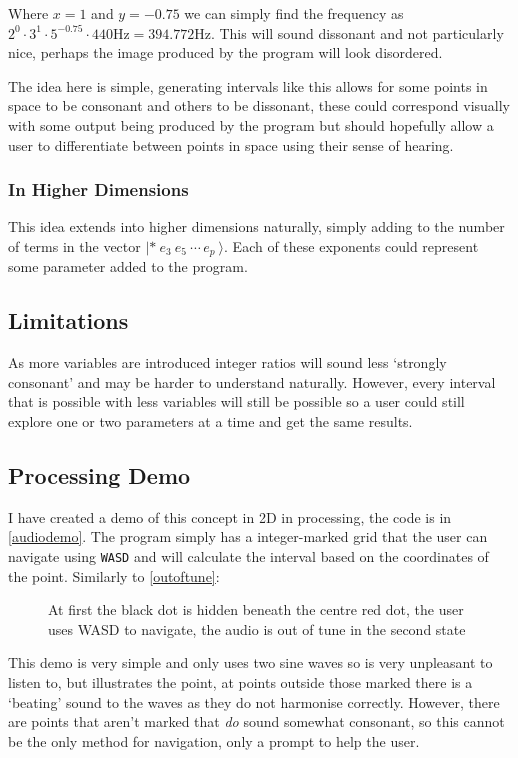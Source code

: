 Where $x=1$ and $y=-0.75$ we can simply find the frequency as $2^0 \cdot 3^1
\cdot 5^{-0.75} \cdot 440\si{\hertz} = 394.772\si{\hertz}$. This will sound
dissonant and not particularly nice, perhaps the image produced by the program
will look disordered.

The idea here is simple, generating intervals like this allows for some points
in space to be consonant and others to be dissonant, these could correspond
visually with some output being produced by the program but should hopefully
allow a user to differentiate between points in space using their sense of
hearing.

\subsubsection{In Higher Dimensions}
This idea extends into higher dimensions naturally, simply adding to the number
of terms in the vector $|*\ e_3\ e_5\ \cdots\, e_p\  \rangle$. Each of these
exponents could represent some parameter added to the program. 

\subsection{Limitations}
As more variables are introduced integer ratios will sound less `strongly
consonant' and may be harder to understand naturally. However, every interval
that is possible with less variables will still be possible so a user could
still explore one or two parameters at a time and get the same results.

\subsection{Processing Demo}
I have created a demo of this concept in 2D in processing, the code is in
\autoref{audiodemo}. The program simply has a integer-marked grid that the user
can navigate using \verb|WASD| and will calculate the interval based on the
coordinates of the point. Similarly to \autoref{outoftune}:

\begin{figure}[h!]
\centering
{}%
\hspace*{2cm}%
\caption{At first the black dot is hidden beneath the centre red dot, the user uses WASD to navigate,
the audio is out of tune in the second state}
\end{figure}

This demo is very simple and only uses two sine waves so is very unpleasant to
listen to, but illustrates the point, at points outside those marked there is a
`beating' sound to the waves as they do not harmonise correctly. However, there
are points that aren't marked that \emph{do} sound somewhat consonant, so this
cannot be the only method for navigation, only a prompt to help the user.
